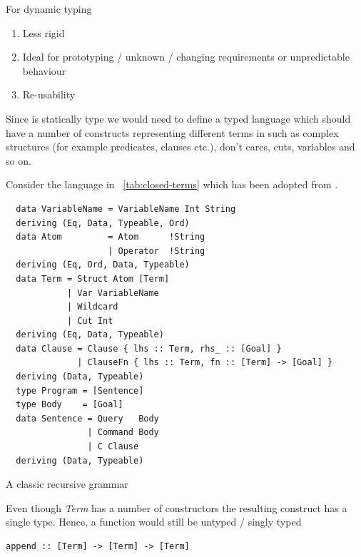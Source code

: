 \documentclass[thesis-solanki.tex]{subfiles}
\begin{document}
For dynamic typing
\begin{enumerate}
\item Less rigid
\item Ideal for prototyping / unknown / changing requirements or unpredictable behaviour
\item Re-usability
\end{enumerate}

Since  is statically type we would need to define a typed language which
should have a number of constructs representing different terms in  such as complex structures
(for example predicates, clauses etc.), don't cares, cuts, variables and so on.

Consider the language {in ~\ref{tab:closed-terms}}\yyy{}{\Large,} which has been adopted from
\cite{prolog-lib}.

\begin{code-list}
\begin{verbatim}
  data VariableName = VariableName Int String
  deriving (Eq, Data, Typeable, Ord)
  data Atom         = Atom      !String
                    | Operator  !String
  deriving (Eq, Ord, Data, Typeable)
  data Term = Struct Atom [Term]
            | Var VariableName
            | Wildcard
            | Cut Int
  deriving (Eq, Data, Typeable)
  data Clause = Clause { lhs :: Term, rhs_ :: [Goal] }
              | ClauseFn { lhs :: Term, fn :: [Term] -> [Goal] }
  deriving (Data, Typeable)
  type Program = [Sentence]
  type Body    = [Goal]
  data Sentence = Query   Body
                | Command Body
                | C Clause
  deriving (Data, Typeable)
\end{verbatim}
  \caption{A classic recursive grammar}
  \label{tab:closed-terms}
\end{code-list}

Even though \textit{Term} has a number of constructors the resulting construct has a single type.
Hence, a function would still be untyped / singly typed
\par
\begin{verbatim}
append :: [Term] -> [Term] -> [Term]
\end{verbatim}

\end{document}
